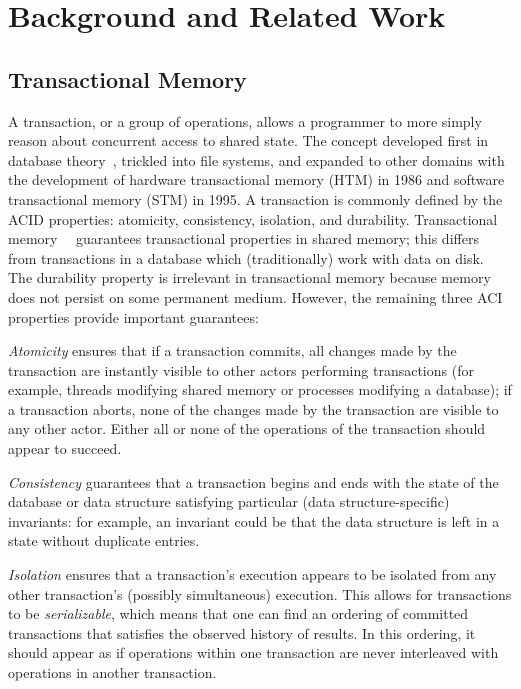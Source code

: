 \chapter{Background and Related Work}
\label{related_work}

\section{Transactional Memory}
A transaction, or a group of operations, allows a programmer to more simply reason about concurrent access to shared state. The concept developed first in database theory~\cite{harristm}, trickled into file systems, and expanded to other domains with the development of hardware transactional memory (HTM) in 1986 and software transactional memory (STM) in 1995. 
A transaction is commonly defined by the ACID properties: atomicity, consistency, isolation, and durability. Transactional memory~\cite{harristm}~\cite{herlihytm} guarantees transactional properties in shared memory; this differs from transactions in a database which (traditionally) work with data on disk.
The durability property is irrelevant in transactional memory because memory does not persist on some permanent medium. However, the remaining three ACI properties provide important guarantees:

\emph{Atomicity} ensures that if a transaction commits, all changes made by the transaction are instantly visible to other actors performing transactions (for example, threads modifying shared memory or processes modifying a database); if a transaction aborts, none of the changes made by the transaction are visible to any other actor. Either all or none of the operations of the transaction should appear to succeed.

\emph{Consistency} guarantees that a transaction begins and ends with the state of the database or data structure satisfying particular (data structure-specific) invariants: for example, an invariant could be that the data structure is left in a state without duplicate entries.

\emph{Isolation} ensures that a transaction's execution appears to be isolated from any other transaction's (possibly simultaneous) execution. This allows for transactions to be \emph{serializable}, which means that one can find an ordering of committed transactions that satisfies the observed history of results. In this ordering, it should appear as if operations within one transaction are never interleaved with operations in another transaction. 

